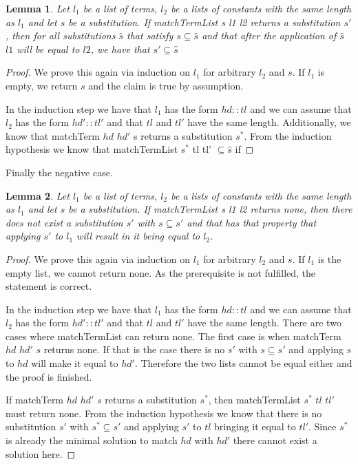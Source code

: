 \documentclass{article}
\newtheorem{lemma}{Lemma}
\begin{document}
        \begin{lemma}
            Let $l_1$ be a list of terms, $l_2$ be a lists of constants with the same length as $l_1$ and let $s$ be a substitution. If matchTermList s l1 l2 returns a substitution $s'$, then for all substitutions $\hat{s}$ that satisfy $s \subseteq \hat{s}$ and that after the application of $\hat{s}$ $l1$ will be equal to $l2$, we have that $s' \subseteq \hat{s}$
        \end{lemma}
        \begin{proof}
            We prove this again via induction on $l_1$ for arbitrary $l_2$ and $s$. If $l_1$ is empty, we return $s$ and the claim is true by assumption.

            In the induction step we have that $l_1$ has the form $hd::tl$ and we can assume that $l_2$ has the form $hd'::tl'$ and that $tl$ and $tl'$ have the same length. Additionally, we know that matchTerm $hd$ $hd'$ s returns a substitution $s^\ast$. From the induction hypothesis we know that matchTermList $s^\ast$ tl tl' $\subseteq \hat{s}$ if 
        \end{proof}

        Finally the negative case.

        \begin{lemma}
            Let $l_1$ be a list of terms, $l_2$ be a lists of constants with the same length as $l_1$ and let $s$ be a substitution. If matchTermList s l1 l2 returns none, then there does not exist a substitution $s'$ with $s \subseteq s'$ and that has that property that applying $s'$ to $l_1$ will result in it being equal to $l_2$.
        \end{lemma}
        \begin{proof}
            We prove this again via induction on $l_1$ for arbitrary $l_2$ and $s$. If $l_1$ is the empty list, we cannot return none. As the prerequisite is not fulfilled, the statement is correct.

            In the induction step we have that $l_1$ has the form $hd::tl$ and we can assume that $l_2$ has the form $hd'::tl'$ and that $tl$ and $tl'$ have the same length. There are two cases where matchTermList can return none. The first case is when matchTerm $hd$ $hd'$ $s$ returns none. If that is the case there is no $s'$ with $s\subseteq s'$ and applying $s$ to $hd$ will make it equal to $hd'$. Therefore the two lists cannot be equal either and the proof is finished.

            If matchTerm $hd$ $hd'$ $s$ returns a substitution $s^\ast$, then matchTermList $s^\ast$ $tl$ $tl'$ must return none. From the induction hypothesis we know that there is no substitution $s'$ with $s^\ast \subseteq s'$ and applying $s'$ to $tl$ bringing it equal to $tl'$. Since $s^\ast$ is already the minimal solution to match $hd$ with $hd'$ there cannot exist a solution here.
        \end{proof}
\end{document}
